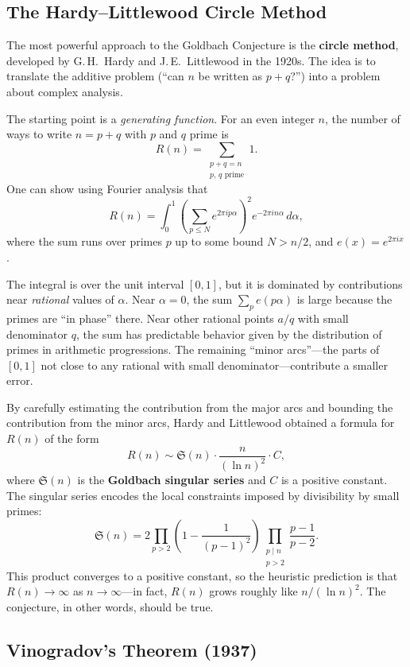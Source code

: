 \subsection{The Hardy--Littlewood Circle Method}

The most powerful approach to the Goldbach Conjecture is the \textbf{circle method}, developed by G.\,H.\ Hardy and J.\,E.\ Littlewood in the 1920s. The idea is to translate the additive problem (``can $n$ be written as $p + q$?'') into a problem about complex analysis.

The starting point is a \emph{generating function}. For an even integer $n$, the number of ways to write $n = p + q$ with $p$ and $q$ prime is
\[
    R(n) = \sum_{\substack{p + q = n \\ p,\, q \text{ prime}}} 1.
\]
One can show using Fourier analysis that
\[
    R(n) = \int_0^1 \left( \sum_{p \leq N} e^{2\pi i p \alpha} \right)^2 e^{-2\pi i n \alpha} \, d\alpha,
\]
where the sum runs over primes $p$ up to some bound $N > n/2$, and $e(x) = e^{2\pi i x}$.

The integral is over the unit interval $[0,1]$, but it is dominated by contributions near \emph{rational} values of $\alpha$. Near $\alpha = 0$, the sum $\sum_p e(p\alpha)$ is large because the primes are ``in phase'' there. Near other rational points $a/q$ with small denominator $q$, the sum has predictable behavior given by the distribution of primes in arithmetic progressions. The remaining ``minor arcs''---the parts of $[0,1]$ not close to any rational with small denominator---contribute a smaller error.

By carefully estimating the contribution from the major arcs and bounding the contribution from the minor arcs, Hardy and Littlewood obtained a formula for $R(n)$ of the form
\[
    R(n) \sim \mathfrak{S}(n) \cdot \frac{n}{(\ln n)^2} \cdot C,
\]
where $\mathfrak{S}(n)$ is the \textbf{Goldbach singular series} and $C$ is a positive constant. The singular series encodes the local constraints imposed by divisibility by small primes:
\[
    \mathfrak{S}(n) = 2 \prod_{p > 2} \left( 1 - \frac{1}{(p-1)^2} \right) \prod_{\substack{p \mid n \\ p > 2}} \frac{p - 1}{p - 2}.
\]
This product converges to a positive constant, so the heuristic prediction is that $R(n) \to \infty$ as $n \to \infty$---in fact, $R(n)$ grows roughly like $n / (\ln n)^2$. The conjecture, in other words, should be true.

\subsection{Vinogradov's Theorem (1937)}

